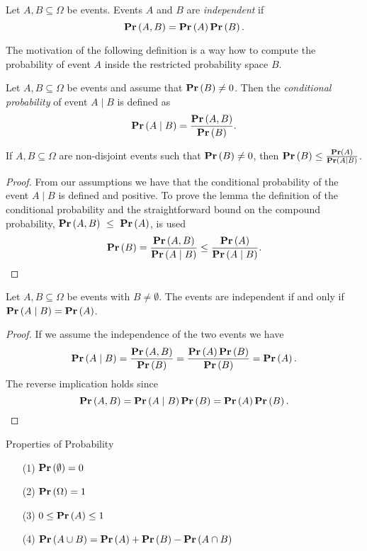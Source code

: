 \begin{definition}
Let $A, B \subseteq \Omega$ be events. Events $A$ and $B$ are \emph{independent} if
\[
\mathbf{Pr}\left(A, B\right) = \mathbf{Pr}\left(A\right)\mathbf{Pr}\left(B\right) \text{.}
\]
\end{definition}

The motivation of the following definition is a way how to compute the probability of event $A$ inside the restricted probability space $B$.
\begin{definition}
Let $A, B \subseteq \Omega$ be events and assume that $\mathbf{Pr}\left(B\right) \neq 0$. Then the \emph{conditional probability} of event $A \mid B$ is defined as
\[
\mathbf{Pr}\left(A \mid B\right) = \frac{\mathbf{Pr}\left(A, B\right)}{\mathbf{Pr}\left(B\right)} \text{.}
\]
\end{definition}

\begin{lemma}
\label{lemma-conditional-probability-event-estimate}
If $A, B \subseteq \Omega$ are non-disjoint events such that $\mathbf{Pr}\left(B\right) \neq 0$, then $\mathbf{Pr}\left(B\right) \leq \frac{\mathbf{Pr}\left(A\right)}{\mathbf{Pr}\left(A \mid B\right)}$.
\end{lemma}
\begin{proof}
From our assumptions we have that the conditional probability of the event $A \mid B$ is defined and positive. To prove the lemma the definition of the conditional probability and the straightforward bound on the compound probability, $\mathbf{Pr}\left(A, B\right)~\leq~\mathbf{Pr}\left(A\right)$, is used
\[
\mathbf{Pr}\left(B\right) = \frac{\mathbf{Pr}\left(A, B\right)}{\mathbf{Pr}\left(A \mid B\right)} \leq \frac{\mathbf{Pr}\left(A\right)}{\mathbf{Pr}\left(A \mid B\right)} \text{.}
\]
\end{proof}

\begin{remark}
Let $A, B \subseteq \Omega$ be events with $B \neq \emptyset$. The events are independent if and only if $\mathbf{Pr}\left(A \mid B\right) = \mathbf{Pr}\left(A\right)$.
\end{remark}
\begin{proof}
If we assume the independence of the two events we have
\[
\mathbf{Pr}\left(A \mid B\right) = \frac{\mathbf{Pr}\left(A, B\right)}{\mathbf{Pr}\left(B\right)} = \frac{\mathbf{Pr}\left(A\right)\mathbf{Pr}\left(B\right)}{\mathbf{Pr}\left(B\right)} = \mathbf{Pr}\left(A\right) \text{.}
\]
The reverse implication holds since
\[
\mathbf{Pr}\left(A, B\right) = \mathbf{Pr}\left(A \mid B\right)\mathbf{Pr}\left(B\right) = \mathbf{Pr}\left(A\right)\mathbf{Pr}\left(B\right) \text{.}
\]
\end{proof}

\begin{lemma}{Properties of Probability}
\begin{enumerate}
\item[(1)] $\mathbf{Pr}\left(\emptyset\right) = 0$
\item[(2)] $\mathbf{Pr}\left(\Omega\right) = 1$
\item[(3)] $0 \leq \mathbf{Pr}\left(A\right) \leq 1$
\item[(4)] $\mathbf{Pr}\left(A \cup B\right) = \mathbf{Pr}\left(A\right) + \mathbf{Pr}\left(B\right) - \mathbf{Pr}\left(A \cap B\right)$
\end{enumerate}
\end{lemma}

